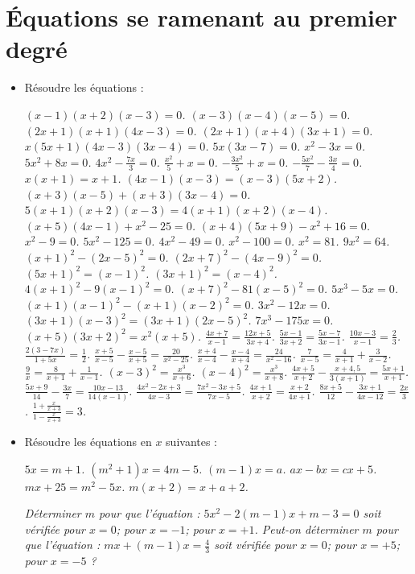 
 \chapter{Équations se ramenant au premier degré}
\begin{itemize}
\item Résoudre les équations :
\begin{itemize}
\it $(x-1)(x+2)(x-3)=0$. 
\it $(x-3)(x-4)(x-5)=0$. 
\it $(2x+1)(x+1)(4x-3) = 0$.
\it $(2x+1)(x+4)(3x+1)=0$. 
\it $x(5x+1)(4x-3)(3x-4)=0$. 
\it $5x(3x-7)=0$.   
\it $x^2-3x=0$. 
\it $5x^2+8x=0$. 
\it $4x^2-\frac{7x}3=0$. 
\it $\frac{x^2}5+x=0$.
\it $-\frac{3x^2}5 + x =0$. 
\it $-\frac{5x^2}7 - \frac{3x}4=0$. 
\it $x(x+1)=x+1$.
\it $(4x-1)(x-3)=(x-3)(5x+2)$.
\it $(x+3)(x-5)+(x+3)(3x-4)=0$.
\it $5(x+1)(x+2)(x-3)=4(x+1)(x+2)(x-4)$.  
\it $(x+5)(4x-1)+x^2-25=0$.
\it $(x+4)(5x+9)-x^2+16=0$.
\it $x^2-9=0$.
\it $5x^2-125=0$.
\it $4x^2-49=0$. 
\it $x^2-100=0$.
\it $x^2=81$.
\it $9x^2=64$. 
\it $(x+1)^2-(2x-5)^2=0$.
\it $(2x+7)^2-(4x-9)^2=0$.
\it $(5x+1)^2=(x-1)^2$.
\it $(3x+1)^2=(x-4)^2$.
\it $4(x+1)^2-9(x-1)^2=0$.
\it $(x+7)^2-81(x-5)^2=0$.
\it $5x^3-5x=0$.
\it $(x+1)(x-1)^2-(x+1)(x-2)^2=0$.
\it $3x^2-12x=0$. 
\it $(3x+1)(x-3)^2=(3x+1)(2x-5)^2$. 
\it $7x^3-175x=0$. 
\it $(x+5)(3x+2)^2=x^2(x+5)$. 
\it $\frac{4x+7}{x-1}=\frac{12x+5}{3x+4}$.
\it $\frac{5x-1}{3x+2}=\frac{5x-7}{3x-1}$.
\it $\frac{10x-3}{x-1}=\frac23$.
\it $\frac{2(3-7x)}{1+5x}=\frac12$.
\it $\frac{x+5}{x-5}-\frac{x-5}{x+5}=\frac{20}{x^2-25}$.
\it $\frac{x+4}{x-4}-\frac{x-4}{x+4}=\frac{24}{x^2-16}$.
\it $\frac7{x-5}=\frac4{x+1}+\frac3{x-2}$.
\it $\frac9x=\frac8{x+1}+\frac1{x-1}$.
\it $(x-3)^2=\frac{x^3}{x+6}$.
\it $(x-4)^2=\frac{x^3}{x+8}$.
\it $\frac{4x+5}{x+2}-\frac{x+4,5}{3(x+1)}=\frac{5x+1}{x+1}$.
\it $\frac{5x+9}{14}-\frac{3x}7=\frac{10x-13}{14(x-1)}$.
\it $\frac{4x^2-2x+3}{4x-3}=\frac{7x^2-3x+5}{7x-5}$.
\it $\frac{4x+1}{x+2}=\frac{x+2}{4x+1}$.
\it $\frac{8x+5}{12}-\frac{3x+1}{4x-12}=\frac{2x}3$.
\it $\frac{1+\frac{x}{x+3}}{1-\frac{x}{x+3}}=3$.
\end{itemize}
\item Résoudre les équations en $x$ suivantes : 
\begin{itemize}
\it $5x=m+1$.
\it $(m^2+1)x=4m-5$.
\it $(m-1)x=a$.
\it $ax-bx=cx+5$.
\it $mx+25=m^2-5x$.
\it $m(x+2)=x+a+2$.
\end{itemize}
\it Déterminer $m$ pour que l'équation : $5x^2-2(m-1)x+m-3=0$ soit vérifiée pour $x=0$; pour $x=-1$; pour $x=+1$.
\it Peut-on déterminer $m$ pour que l'équation : $mx+(m-1)x=\frac43$ soit vérifiée pour $x=0$; pour $x=+5$; pour $x=-5$ ? 

\end{itemize}

